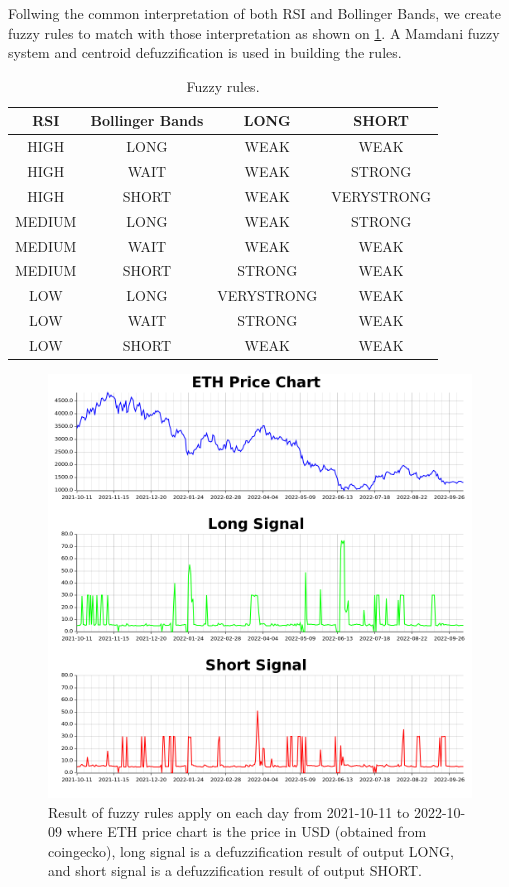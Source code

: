 \documentclass{article}
\begin{document}
\FloatBarrier
Follwing the common interpretation of both RSI and Bollinger Bands, we create fuzzy rules to match with those interpretation 
as shown on \cref{table:3}. A Mamdani fuzzy system and centroid defuzzification is used in building the rules.

\begin{table}[htp]
	\centering
	\begin{tabular}{c c c c}
		\toprule
        {RSI} & {Bollinger Bands} & {LONG} & {SHORT} \\ 
        \midrule
        HIGH & LONG & WEAK & WEAK \\
        HIGH & WAIT & WEAK & STRONG \\
        HIGH & SHORT & WEAK & VERYSTRONG \\
        MEDIUM & LONG & WEAK & STRONG \\
        MEDIUM & WAIT & WEAK & WEAK \\
        MEDIUM & SHORT & STRONG & WEAK \\
        LOW & LONG & VERYSTRONG & WEAK \\
        LOW & WAIT & STRONG & WEAK \\
        LOW & SHORT & WEAK & WEAK \\
        \bottomrule
    \end{tabular} 
    \caption{Fuzzy rules.}
	\label{table:3}
\end{table}
\FloatBarrier

\begin{figure}[ht]
    \centering
    \includegraphics[scale=0.45]{chart.png}
    \caption{Result of fuzzy rules apply on each day from 2021-10-11 to 2022-10-09 where ETH price chart 
    is the price in USD (obtained from coingecko), long signal is a defuzzification result of output LONG, and short signal is a 
    defuzzification result of output SHORT.}
    \label{fig:2}
\end{figure}
\FloatBarrier
\end{document}
